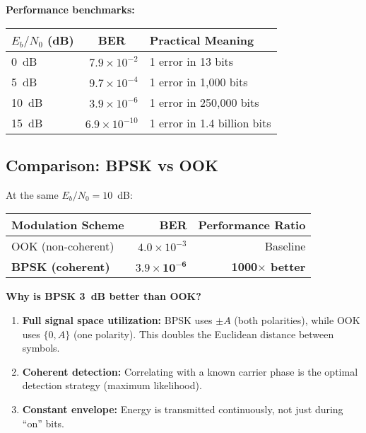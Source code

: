 \textbf{Performance benchmarks:}

\begin{center}
\begin{tabular}{@{}lrl@{}}
\toprule
$E_b/N_0$ (dB) & \multicolumn{1}{c}{BER} & Practical Meaning \\
\midrule
0~dB & $7.9 \times 10^{-2}$ & 1 error in 13 bits \\
5~dB & $9.7 \times 10^{-4}$ & 1 error in 1,000 bits \\
10~dB & $3.9 \times 10^{-6}$ & 1 error in 250,000 bits \\
15~dB & $6.9 \times 10^{-10}$ & 1 error in 1.4 billion bits \\
\bottomrule
\end{tabular}
\end{center}

\subsection{Comparison: BPSK vs OOK}

At the same $E_b/N_0 = 10$~dB:

\begin{center}
\begin{tabular}{@{}lrr@{}}
\toprule
Modulation Scheme & BER & Performance Ratio \\
\midrule
OOK (non-coherent) & $4.0 \times 10^{-3}$ & Baseline \\
\textbf{BPSK (coherent)} & $\mathbf{3.9 \times 10^{-6}}$ & \textbf{1000$\times$ better} \\
\bottomrule
\end{tabular}
\end{center}

\begin{keyconcept}
\textbf{Why is BPSK 3~dB better than OOK?}

\begin{enumerate}
\item \textbf{Full signal space utilization:} BPSK uses $\pm A$ (both polarities), while OOK uses $\{0, A\}$ (one polarity). This doubles the Euclidean distance between symbols.

\item \textbf{Coherent detection:} Correlating with a known carrier phase is the optimal detection strategy (maximum likelihood).

\item \textbf{Constant envelope:} Energy is transmitted continuously, not just during ``on'' bits.
\end{enumerate}
\end{keyconcept}

